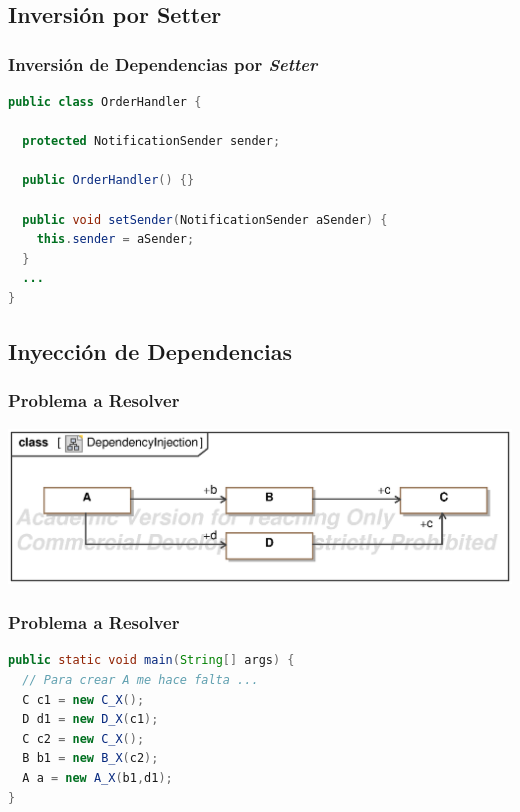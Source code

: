 \documentclass[a4paper,t,xcolor=pst,dvips,colortheme]{beamer}
\begin{document}
\subsection{Inversión por Setter}

\begin{frame}[c,fragile]
	\frametitle{Inversión de Dependencias por \emph{Setter}}
\begin{lstlisting}[basicstyle=\footnotesize,language=Java]
public class OrderHandler {

  protected NotificationSender sender;
	
  public OrderHandler() {}
	
  public void setSender(NotificationSender aSender) {
    this.sender = aSender;
  }
  ...
}
\end{lstlisting}
\end{frame}

\subsection{Inyección de Dependencias}

\begin{frame}[c]
	\frametitle{Problema a Resolver}
	\begin{center}
        \includegraphics[width=\linewidth,keepaspectratio=true]{images/iod/DependencyInjection.eps}
	\end{center}
\end{frame}

\begin{frame}[c,fragile]
	\frametitle{Problema a Resolver}
\begin{lstlisting}[basicstyle=\footnotesize,language=Java]
public static void main(String[] args) {
  // Para crear A me hace falta ...
  C c1 = new C_X();
  D d1 = new D_X(c1);
  C c2 = new C_X();
  B b1 = new B_X(c2);
  A a = new A_X(b1,d1);
}
\end{lstlisting}
\end{frame}
\end{document}

